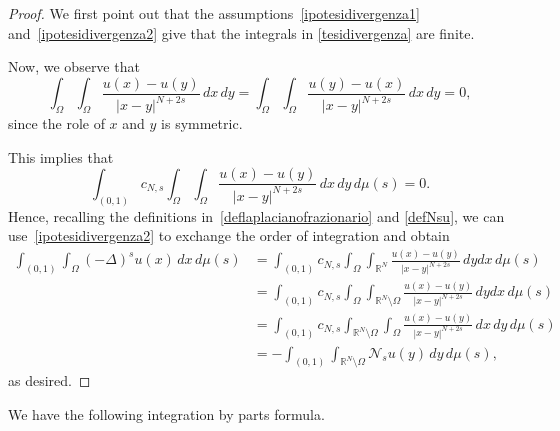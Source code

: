 \documentclass[12pt,a4paper,intlimits,sumlimits]{amsart}
\def \R {\mathbb{R}}
\def \Ns {\mathscr{N}_{s}}
\theoremstyle{definition}
\theoremstyle{plain}
\numberwithin{equation}{section}
\begin{document}
\begin{proof}
We first point out that the assumptions~\eqref{ipotesidivergenza1}
and~\eqref{ipotesidivergenza2} give that the integrals in 
\eqref{tesidivergenza} are finite.

Now, we observe that
\[
\int_\Omega\int_\Omega \frac{u(x)-u(y)}{|x-y|^{N+2s}}\,dx\,dy
=\int_\Omega\int_\Omega \frac{u(y)-u(x)}{|x-y|^{N+2s}}\,dx\,dy=0,
\]
since the role of $x$ and $y$ is symmetric. 

This implies that
\[
\int_{(0, 1)}c_{N,s}\int_\Omega\int_\Omega \frac{u(x)-u(y)}{|x-y|^{N+2s}}\,dx\,dy \,d\mu(s)=0.
\]
Hence, recalling the definitions in~\eqref{deflaplacianofrazionario} and
\eqref{defNsu}, we can use~\eqref{ipotesidivergenza2} to 
exchange the order of integration and obtain
\[
\begin{aligned}
\int_{(0, 1)}\int_\Omega (-\Delta)^su(x)\,dx\,d\mu(s)&=\int_{(0, 1)}c_{N,s}\int_\Omega \int_{\R^N}
\frac{u(x)-u(y)}{|x-y|^{N+2s}}\,dydx \,d\mu(s) \\
&=\int_{(0, 1)}c_{N,s}\int_\Omega \int_{\R^N\setminus \Omega}\frac{u(x)-u(y)}{|x-y|^{N+2s}}\,dydx \,d\mu(s) \\
&=\int_{(0, 1)}c_{N,s} \int_{\R^N\setminus \Omega}\int_\Omega\frac{u(x)-u(y)}{|x-y|^{N+2s}}\,dx\,dy \,d\mu(s) \\
&=-\int_{(0, 1)}\int_{\R^N\setminus \Omega}\Ns u(y)\,dy\,d\mu(s),
\end{aligned}
\]
as desired.
\end{proof}

We have the following integration by parts formula.
\end{document}
